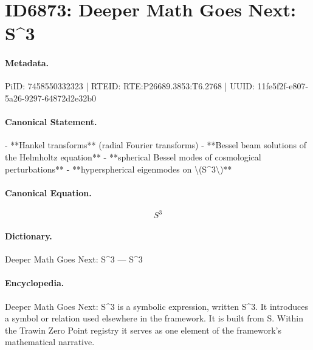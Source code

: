 \section*{ID6873: Deeper Math Goes Next: S\textasciicircum{}3}
\paragraph{Metadata.}
PiID: 7458550332323 | RTEID: RTE:P26689.3853:T6.2768 | UUID: 11fe5f2f-e807-5a26-9297-64872d2e32b0

\paragraph{Canonical Statement.}
- **Hankel transforms** (radial Fourier transforms) - **Bessel beam solutions of the Helmholtz equation** - **spherical Bessel modes of cosmological perturbations** - **hyperspherical eigenmodes on \textbackslash{}(S\textasciicircum{}3\textbackslash{})**

\paragraph{Canonical Equation.}
\[
S^3
\]

\paragraph{Dictionary.}
Deeper Math Goes Next: S\textasciicircum{}3 — S\textasciicircum{}3

\paragraph{Encyclopedia.}
Deeper Math Goes Next: S\textasciicircum{}3 is a symbolic expression, written S\textasciicircum{}3. It introduces a symbol or relation used elsewhere in the framework. It is built from S. Within the Trawin Zero Point registry it serves as one element of the framework's mathematical narrative.
